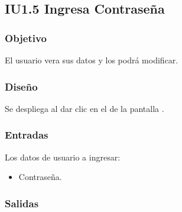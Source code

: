 \newpage
\subsection{IU1.5 Ingresa Contraseña}

\subsubsection{Objetivo}
	El usuario vera sus datos y los podrá modificar.  

\subsubsection{Diseño}
	Se despliega al dar clic en el  de la pantalla .


\subsubsection{Entradas}
Los datos de usuario a ingresar:
\begin{itemize}	
	\item Contraseña.
\end{itemize}

\subsubsection{Salidas}
\begin{Citemize}
	\item {}
	\item {}
	\item {}
\end{Citemize} 
